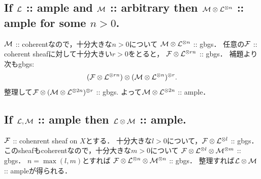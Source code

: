 \documentclass[a4paper]{jsarticle}
\begin{document}
    \subsection{If $\mathcal{L}$ :: ample and $\mathcal{M}$ :: arbitrary
        then $\mathcal{M} \otimes \mathcal{L}^{\otimes n}$ :: ample for some $n>0$.}
        $\mathcal{M}$ :: coherentなので，十分大きな$n>0$について
        $\mathcal{M} \otimes \mathcal{L}^{\otimes n}$ :: gbgs．
        任意の$\mathcal{F}$ :: coherent sheafに対して十分大きい$r>0$をとると，
        $\mathcal{F} \otimes \mathcal{L}^{\otimes rn}$ :: gbgs．
        補題より次もgbgs:
        \[ (\mathcal{F} \otimes \mathcal{L}^{\otimes rn}) \otimes (\mathcal{M} \otimes \mathcal{L}^{\otimes n})^{\otimes r}. \]
        整理して$\mathcal{F} \otimes (\mathcal{M} \otimes \mathcal{L}^{\otimes 2n})^{\otimes r}$ :: gbgs.
        よって$\mathcal{M} \otimes \mathcal{L}^{\otimes 2n}$ :: ample．

    \subsection{If $\mathcal{L}, \mathcal{M}$ :: ample then $\mathcal{L} \otimes \mathcal{M}$ :: ample.}
        $\mathcal{F}$ :: cohenrent sheaf on $X$とする．
        十分大きな$l>0$について，$\mathcal{F} \otimes \mathcal{L}^{\otimes l}$ :: gbgs．
        このsheafもcoherentなので，十分大きな$m>0$について
        $\mathcal{F} \otimes \mathcal{L}^{\otimes l} \otimes \mathcal{M}^{\otimes m}$ :: gbgs．
        $n=\max(l,m)$とすれば
        $\mathcal{F} \otimes \mathcal{L}^{\otimes n} \otimes \mathcal{M}^{\otimes n}$ :: gbgs．
        整理すれば$\mathcal{L} \otimes \mathcal{M}$ :: ampleが得られる．
\end{document}
